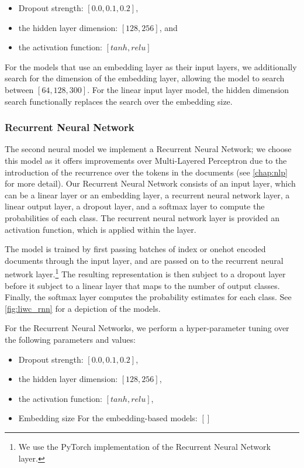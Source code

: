 \begin{itemize}
  \item Dropout strength: $[0.0, 0.1, 0.2]$, 
  \item the hidden layer dimension: $[128, 256]$, and
  \item the activation function: $[tanh, relu]$
\end{itemize}

For the models that use an embedding layer as their input layers, we additionally search for the dimension of the embedding layer, allowing the model to search between $[64, 128, 300]$. For the linear input layer model, the hidden dimension search functionally replaces the search over the embedding size.

\subsubsection{Recurrent Neural Network}

The second neural model we implement a Recurrent Neural Network; we choose this model as it offers improvements over Multi-Layered Perceptron due to the introduction of the recurrence over the tokens in the documents (see \autoref{chap:nlp} for more detail). Our Recurrent Neural Network consists of an input layer, which can be a linear layer or an embedding layer, a recurrent neural network layer, a linear output layer, a dropout layer, and a softmax layer to compute the probabilities of each class. The recurrent neural network layer is provided an activation function, which is applied within the layer.

The model is trained by first passing batches of index or onehot encoded documents through the input layer, and are passed on to the recurrent neural network layer.\footnote{We use the PyTorch implementation of the Recurrent Neural Network layer.} The resulting representation is then subject to a dropout layer before it subject to a linear layer that maps to the number of output classes. Finally, the softmax layer computes the probability estimates for each class. See \autoref{fig:liwc_rnn} for a depiction of the models.

For the Recurrent Neural Networks, we perform a hyper-parameter tuning over the following parameters and values:

\begin{itemize}
  \item Dropout strength: $[0.0, 0.1, 0.2]$, 
  \item the hidden layer dimension: $[128, 256]$,
  \item the activation function: $[tanh, relu]$,
  \item Embedding size  For the embedding-based models: $[]$
\end{itemize}

